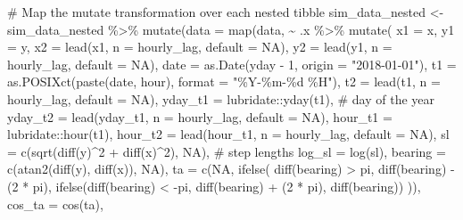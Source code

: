\documentclass[
  letterpaper,
  DIV=11,
  numbers=noendperiod]{scrartcl}
\newenvironment{Shaded}{\begin{snugshade}}{\end{snugshade}}
\newcommand{\AttributeTok}[1]{\textcolor[rgb]{0.40,0.45,0.13}{#1}}
\newcommand{\CommentTok}[1]{\textcolor[rgb]{0.37,0.37,0.37}{#1}}
\newcommand{\ConstantTok}[1]{\textcolor[rgb]{0.56,0.35,0.01}{#1}}
\newcommand{\DecValTok}[1]{\textcolor[rgb]{0.68,0.00,0.00}{#1}}
\newcommand{\FunctionTok}[1]{\textcolor[rgb]{0.28,0.35,0.67}{#1}}
\newcommand{\NormalTok}[1]{\textcolor[rgb]{0.00,0.23,0.31}{#1}}
\newcommand{\OtherTok}[1]{\textcolor[rgb]{0.00,0.23,0.31}{#1}}
\newcommand{\SpecialCharTok}[1]{\textcolor[rgb]{0.37,0.37,0.37}{#1}}
\newcommand{\StringTok}[1]{\textcolor[rgb]{0.13,0.47,0.30}{#1}}
\begin{document}
\begin{Shaded}
\begin{Highlighting}[]
\CommentTok{\# Map the mutate transformation over each nested tibble}
\NormalTok{sim\_data\_nested }\OtherTok{\textless{}{-}}\NormalTok{ sim\_data\_nested }\SpecialCharTok{\%\textgreater{}\%}
  \FunctionTok{mutate}\NormalTok{(}\AttributeTok{data =} \FunctionTok{map}\NormalTok{(data, }\SpecialCharTok{\textasciitilde{}}\NormalTok{ .x }\SpecialCharTok{\%\textgreater{}\%}
    \FunctionTok{mutate}\NormalTok{(}
      \AttributeTok{x1 =}\NormalTok{ x,}
      \AttributeTok{y1 =}\NormalTok{ y,}
      \AttributeTok{x2 =} \FunctionTok{lead}\NormalTok{(x1, }\AttributeTok{n =}\NormalTok{ hourly\_lag, }\AttributeTok{default =} \ConstantTok{NA}\NormalTok{),}
      \AttributeTok{y2 =} \FunctionTok{lead}\NormalTok{(y1, }\AttributeTok{n =}\NormalTok{ hourly\_lag, }\AttributeTok{default =} \ConstantTok{NA}\NormalTok{),}
      \AttributeTok{date =} \FunctionTok{as.Date}\NormalTok{(yday }\SpecialCharTok{{-}} \DecValTok{1}\NormalTok{, }\AttributeTok{origin =} \StringTok{"2018{-}01{-}01"}\NormalTok{),}
      \AttributeTok{t1 =} \FunctionTok{as.POSIXct}\NormalTok{(}\FunctionTok{paste}\NormalTok{(date, hour), }\AttributeTok{format =} \StringTok{"\%Y{-}\%m{-}\%d \%H"}\NormalTok{),}
      \AttributeTok{t2 =} \FunctionTok{lead}\NormalTok{(t1, }\AttributeTok{n =}\NormalTok{ hourly\_lag, }\AttributeTok{default =} \ConstantTok{NA}\NormalTok{),}
      \AttributeTok{yday\_t1 =}\NormalTok{ lubridate}\SpecialCharTok{::}\FunctionTok{yday}\NormalTok{(t1), }\CommentTok{\# day of the year}
      \AttributeTok{yday\_t2 =} \FunctionTok{lead}\NormalTok{(yday\_t1, }\AttributeTok{n =}\NormalTok{ hourly\_lag, }\AttributeTok{default =} \ConstantTok{NA}\NormalTok{),}
      \AttributeTok{hour\_t1 =}\NormalTok{ lubridate}\SpecialCharTok{::}\FunctionTok{hour}\NormalTok{(t1),}
      \AttributeTok{hour\_t2 =} \FunctionTok{lead}\NormalTok{(hour\_t1, }\AttributeTok{n =}\NormalTok{ hourly\_lag, }\AttributeTok{default =} \ConstantTok{NA}\NormalTok{),}
      \AttributeTok{sl =} \FunctionTok{c}\NormalTok{(}\FunctionTok{sqrt}\NormalTok{(}\FunctionTok{diff}\NormalTok{(y)}\SpecialCharTok{\^{}}\DecValTok{2} \SpecialCharTok{+} \FunctionTok{diff}\NormalTok{(x)}\SpecialCharTok{\^{}}\DecValTok{2}\NormalTok{), }\ConstantTok{NA}\NormalTok{),  }\CommentTok{\# step lengths}
      \AttributeTok{log\_sl =} \FunctionTok{log}\NormalTok{(sl),}
      \AttributeTok{bearing =} \FunctionTok{c}\NormalTok{(}\FunctionTok{atan2}\NormalTok{(}\FunctionTok{diff}\NormalTok{(y), }\FunctionTok{diff}\NormalTok{(x)), }\ConstantTok{NA}\NormalTok{),}
      \AttributeTok{ta =} \FunctionTok{c}\NormalTok{(}\ConstantTok{NA}\NormalTok{, }\FunctionTok{ifelse}\NormalTok{(}
        \FunctionTok{diff}\NormalTok{(bearing) }\SpecialCharTok{\textgreater{}}\NormalTok{ pi, }\FunctionTok{diff}\NormalTok{(bearing) }\SpecialCharTok{{-}}\NormalTok{ (}\DecValTok{2} \SpecialCharTok{*}\NormalTok{ pi),}
        \FunctionTok{ifelse}\NormalTok{(}\FunctionTok{diff}\NormalTok{(bearing) }\SpecialCharTok{\textless{}} \SpecialCharTok{{-}}\NormalTok{pi, }\FunctionTok{diff}\NormalTok{(bearing) }\SpecialCharTok{+}\NormalTok{ (}\DecValTok{2} \SpecialCharTok{*}\NormalTok{ pi), }\FunctionTok{diff}\NormalTok{(bearing))}
\NormalTok{      )),}
      \AttributeTok{cos\_ta =} \FunctionTok{cos}\NormalTok{(ta),}
      

\end{Highlighting}
\end{Shaded}
\end{document}
